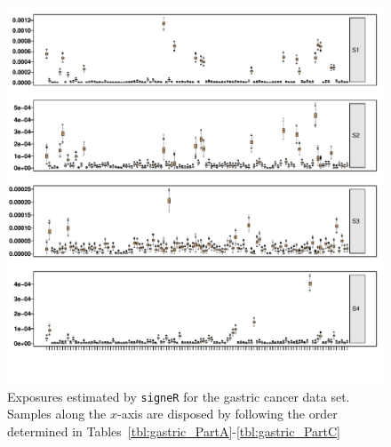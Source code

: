 \documentclass[11pt]{amsart}
\theoremstyle{definition}
\begin{document}
\begin{center}
\begin{figure}
  \includegraphics[width=16cm]
     {sfigs/Exposure_boxplot_Mcur_lauren_nonames}
  \caption{Exposures estimated by \texttt{signeR} for the gastric cancer
  data set. Samples along the $x$-axis are disposed by following the order
  determined in
  Tables~\ref{tbl:gastric_PartA}-\ref{tbl:gastric_PartC}}\label{fig:gastricExposures}
\end{figure}
\end{center}
\vspace{-3.5cm}


\vspace{1.6cm}
\end{document}
